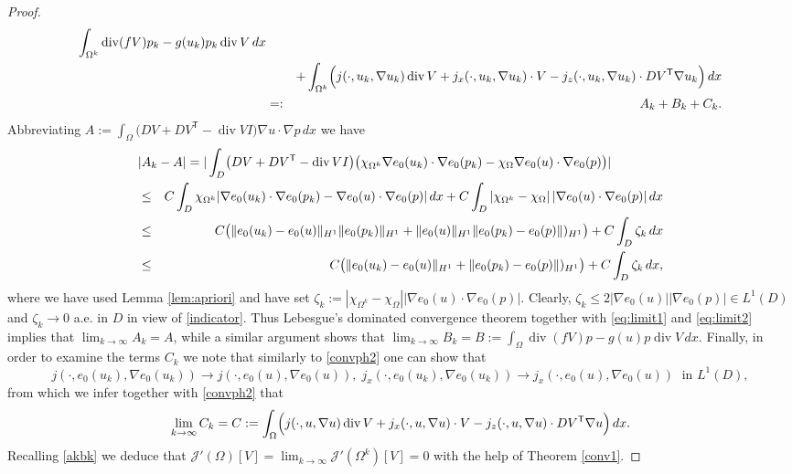\documentclass[a4paper,10pt]{article}
\newcommand{\dx}{\,dx}
\theoremstyle{plain}
\theoremstyle{plain}
\numberwithin{equation}{section}
\DeclareMathOperator{\Div}{div}
\begin{document}
\begin{proof}
\begin{eqnarray}
\int_{\Omega^k} \Div( f V) p_k  - g(u_k)p_k \Div V \dx \nonumber \\
&  & +  \int_{\Omega^k} \Bigl( j(\cdot,u_k,\nabla u_k) \Div V +  j_x(\cdot,u_k,\nabla u_k) \cdot V - j_z(\cdot,u_k,\nabla u_k) \cdot DV^{\mathsf{T}} \nabla u_k \Bigr)  \dx  \nonumber  \\
& =: & A_k+B_k + C_k. \label{akbk}
\end{eqnarray} 
Abbreviating $A:=\int_{\Omega}  
\bigl( DV + D V^{\mathsf{T}} - \Div V I \bigr)  \nabla u \cdot \nabla p   \dx $ we have
\begin{eqnarray*}
\lefteqn{
| A_k - A |  = | \int_D \bigl( DV + D V^{\mathsf{T}} - \Div V I \bigr) \bigl( 
\chi_{\Omega^k} \nabla e_0(u_k) \cdot \nabla e_0(p_k) - \chi_{\Omega} \nabla e_0(u) \cdot \nabla e_0(p) 
\bigr) | }\\
& \leq & C \int_D \chi_{\Omega^k} | \nabla e_0(u_k) \cdot \nabla e_0(p_k) - \nabla e_0(u) \cdot \nabla e_0(p) |  \dx + C \int_D | \chi_{\Omega^k} - \chi_{\Omega} | \,  | \nabla e_0(u) \cdot \nabla e_0(p) |  \dx \\
& \leq & C \bigl( \Vert e_0(u_k) - e_0(u) \Vert_{H^1} \Vert e_0(p_k) \Vert_{H^1} +
\Vert e_0(u) \Vert_{H^1} \Vert e_0(p_k) - e_0(p) \Vert)_{H^1} \bigr)  +  C \int_D \zeta_k   \dx \\
& \leq & C \bigl( \Vert e_0(u_k) - e_0(u) \Vert_{H^1} +
 \Vert e_0(p_k) - e_0(p) \Vert)_{H^1} \bigr)  +  C \int_D \zeta_k   \dx,
\end{eqnarray*}
where  we have used Lemma \ref{lem:apriori} and have set $ \zeta_k:=| \chi_{\Omega^k} - \chi_{\Omega} | | \nabla e_0(u) \cdot \nabla e_0(p) |$. Clearly, $\zeta_k \leq 2 | \nabla e_0(u)| | \nabla e_0(p)| \in L^1(D)$ and $\zeta_k \rightarrow 0$ a.e. in $D$ in view of \eqref{indicator}. Thus Lebesgue's dominated convergence theorem together with  \eqref{eq:limit1} and \eqref{eq:limit2} implies that $\lim_{k \rightarrow \infty} A_k=A$, while a  similar argument
shows that $\lim_{k \rightarrow \infty} B_k=B:= \int_\Omega \Div (fV) p - g(u)p \Div V \dx$. Finally, in order to
examine the terms $C_k$ we note that similarly to \eqref{convph2} one can show that
\begin{displaymath}
j(\cdot,e_0(u_k),\nabla e_0(u_k))  \rightarrow j(\cdot,e_0(u), \nabla e_0(u)), \; 
j_x(\cdot,e_0(u_k),\nabla e_0(u_k))  \rightarrow  j_x(\cdot,e_0(u), \nabla e_0(u)) \; \mbox{ in } L^1(D),
\end{displaymath}
from which we infer together with \eqref{convph2} that 
\begin{displaymath}
\lim_{k \rightarrow \infty} C_k = C:= \int_{\Omega} \Bigl( j(\cdot,u,\nabla u) \Div V +  j_x(\cdot,u,\nabla u) \cdot V - j_z(\cdot,u,\nabla u) \cdot DV^{\mathsf{T}} \nabla u \Bigr)  \dx.
\end{displaymath}
Recalling \eqref{akbk} we deduce that $\mathcal J'(\Omega)[V]= \lim_{k \rightarrow \infty} \mathcal J'(\Omega^k)[V]  =0$ with the help of  Theorem \ref{conv1}.
\end{proof}
\end{document}
